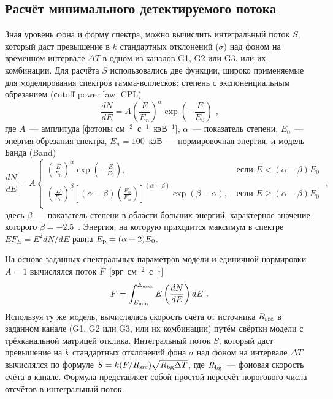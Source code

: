\subsection{Расчёт минимального детектируемого потока}
Зная уровень фона и форму спектра, можно вычислить интегральный поток $S$, который 
даст превышение в $k$ стандартных отклонений ($\sigma$) над фоном на временном 
интервале $\Delta T$ в одном из каналов G1, G2 или G3, или их комбинации.
Для расчёта $S$ использовались две функции, широко применяемые для моделирования 
спектров гамма-всплесков: степень с экспоненциальным обрезанием (сutoff power law, CPL)
\begin{equation}\label{eq:CPL}
\frac{dN}{dE} = A \left(\frac{E}{E_n}\right)^\alpha \exp\left(-\frac{E}{E_0}\right) \mbox{ ,}
\end{equation}
где $A$~--- амплитуда [фотоны см$^{-2}$~с$^{-1}$~кэВ$^{-1}$], $\alpha$~--- показатель степени,
$E_0$~--- энергия обрезания спектра, $E_n = 100$~кэВ~--- нормировочная энергия,
и модель Банда (Band)~\citep{Band_1993ApJ}
\begin{equation}\label{eq:Band}
\frac{dN}{dE}=A \left\{
\begin{array}{lr}
\left(\frac{E}{E_n}\right)^\alpha \exp\left(-\frac{E}{E_0}\right) \mbox{, } 
&\mbox{если } E<(\alpha-\beta)E_0\\
\left(\frac{E}{E_n}\right)^\beta 
\left[(\alpha-\beta)\left(\frac{E_0}{E_n}\right)\right]^{(\alpha-\beta)} 
\exp(\beta-\alpha)  \mbox{, } &\mbox{если } E\geq(\alpha-\beta)E_0 \\
\end{array}
\right. \mbox{ ,}
\end{equation}
здесь $\beta$~--- показатель степени в области больших энергий, 
характерное значение которого $\beta = -2.5$~\citep{Goldstein_2013ApJS, Gruber_2014ApJS}. 
Энергия, на которую приходится максимум в спектре $E F_E = E^2 dN/dE$ равна $E_{\mathrm{p}}=(\alpha+2) E_0$.

На основе заданных спектральных параметров модели и единичной нормировки $A=1$ 
вычислялся поток $F$~[эрг~см$^{-2}$~с$^{-1}$]
\begin{equation}\label{eq:flux}
F = \int_{E_{\mathrm{min}}}^{E_{\mathrm{max}}} E \left(\frac{dN}{dE}\right) dE \mbox{ .}
\end{equation}
Используя ту же модель, вычислялась скорость счёта от источника $R_{\mathrm{src}}$ в 
заданном канале (G1, G2 или G3, или их комбинации) путём свёртки 
модели с трёхканальной матрицей отклика. Интегральный поток $S$, который даст 
превышение на $k$ стандартных отклонений фона $\sigma$ над фоном на интервале $\Delta T$ 
вычислялся по формуле $S = k (F/R_{\mathrm{src}}) \sqrt{R_{\mathrm{bg}} \Delta T}$, 
где $R_{\mathrm{bg}}$~--- фоновая скорость счёта в канале. Формула представляет собой простой 
пересчёт порогового числа отсчётов в интегральный поток.


